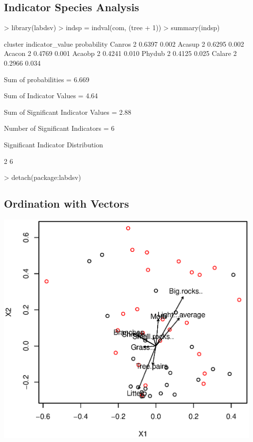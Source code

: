 \documentclass[a4paper]{article}
\begin{document}
\subsection{Indicator Species Analysis}

\begin{Schunk}
\begin{Sinput}
> library(labdsv)
> indsp = indval(com, (tree + 1))
> summary(indsp)
\end{Sinput}
\begin{Soutput}
       cluster indicator_value probability
Canros       2          0.6397       0.002
Acasup       2          0.6295       0.002
Acacon       2          0.4769       0.001
Acaobp       2          0.4241       0.010
Phydub       2          0.4125       0.025
Calare       2          0.2966       0.034

Sum of probabilities                 =  6.669 

Sum of Indicator Values              =  4.64 

Sum of Significant Indicator Values  =  2.88 

Number of Significant Indicators     =  6 

Significant Indicator Distribution

2 
6 
\end{Soutput}
\begin{Sinput}
> detach(package:labdsv)
\end{Sinput}
\end{Schunk}

\subsection{Ordination with Vectors}

\begin{Schunk}
\end{Schunk}
\includegraphics{SCRL_tex-012}
\end{document}
